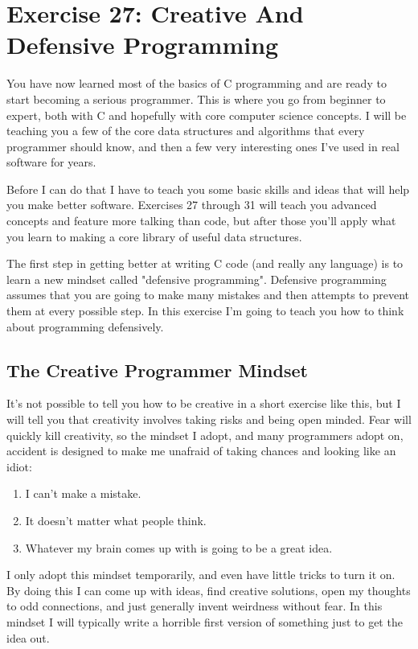 \chapter{Exercise 27: Creative And Defensive Programming}

You have now learned most of the basics of C programming and are ready to start becoming a serious
programmer.  This is where you go from beginner to expert, both with C and hopefully with
core computer science concepts.  I will be teaching you a few of the core data structures and
algorithms that every programmer should know, and then a few very interesting ones I've used
in real software for years.

Before I can do that I have to teach you some basic skills and ideas that will help you
make better software.  Exercises 27 through 31 will teach you advanced concepts and feature
more talking than code, but after those you'll apply what you learn to making a core library
of useful data structures.

The first step in getting better at writing C code (and really any language) is
to learn a new mindset called "defensive programming".  Defensive programming
assumes that you are going to make many mistakes and then attempts to prevent
them at every possible step.   In this exercise I'm going to teach you how 
to think about programming defensively.

\section{The Creative Programmer Mindset}

It's not possible to tell you how to be creative in a short exercise like this,
but I will tell you that creativity involves taking risks and being open minded.
Fear will quickly kill creativity, so the mindset I adopt, and many programmers
adopt on, accident is designed to make me unafraid of taking chances and 
looking like an idiot:

\begin{enumerate}
\item I can't make a mistake.
\item It doesn't matter what people think.
\item Whatever my brain comes up with is going to be a great idea.
\end{enumerate}

I only adopt this mindset temporarily, and even have little tricks to turn it on.
By doing this I can come up with ideas, find creative solutions, open my thoughts
to odd connections, and just generally invent weirdness without fear.  In this
mindset I will typically write a horrible first version of something just to get
the idea out.


